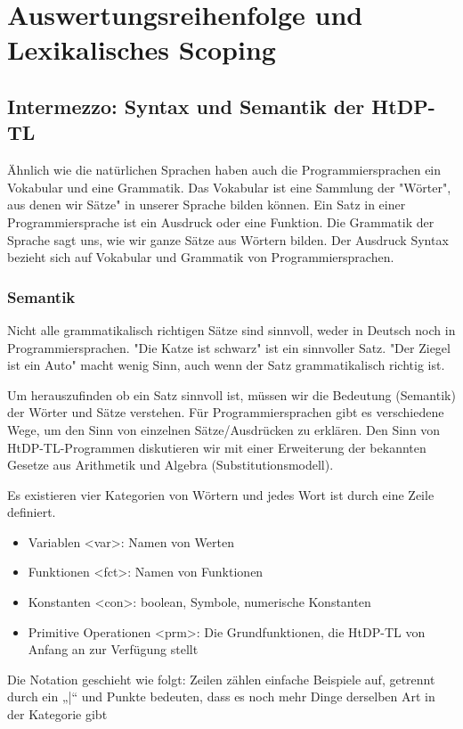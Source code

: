 \chapter{Auswertungsreihenfolge und Lexikalisches Scoping}

\section{Intermezzo: Syntax und Semantik der HtDP-TL}

Ähnlich wie die natürlichen Sprachen haben auch die
Programmiersprachen ein Vokabular und eine Grammatik. Das Vokabular ist eine Sammlung der "Wörter", aus denen wir Sätze" in unserer Sprache bilden können. Ein Satz in einer Programmiersprache ist ein Ausdruck oder eine Funktion. Die Grammatik der Sprache sagt uns, wie wir ganze Sätze aus Wörtern bilden. Der Ausdruck Syntax bezieht sich auf Vokabular und Grammatik von Programmiersprachen.

\subsection{Semantik}

Nicht alle grammatikalisch richtigen Sätze sind sinnvoll, weder in Deutsch noch in Programmiersprachen. "Die Katze ist schwarz" ist ein sinnvoller Satz. "Der Ziegel ist ein Auto" macht wenig Sinn, auch wenn der Satz grammatikalisch richtig ist.

Um herauszufinden ob ein Satz sinnvoll ist, müssen wir die
Bedeutung (Semantik) der Wörter und Sätze verstehen. Für Programmiersprachen gibt es verschiedene Wege, um den Sinn
von einzelnen Sätze/Ausdrücken zu erklären. Den Sinn von HtDP-TL-Programmen diskutieren wir mit einer Erweiterung der bekannten Gesetze aus Arithmetik und Algebra (Substitutionsmodell).

Es existieren vier Kategorien von Wörtern und jedes Wort ist durch eine Zeile definiert.
\begin{itemize}
	\item Variablen <var>: Namen von Werten
	\item Funktionen <fct>: Namen von Funktionen
	\item Konstanten <con>: boolean, Symbole, numerische Konstanten
	\item Primitive Operationen <prm>: Die Grundfunktionen, die HtDP-TL von Anfang an zur Verfügung stellt
\end{itemize}

Die Notation geschieht wie folgt:
Zeilen zählen einfache Beispiele auf, getrennt durch ein „|“ und Punkte bedeuten, dass es noch mehr Dinge derselben Art in der Kategorie gibt

\noindent{}
